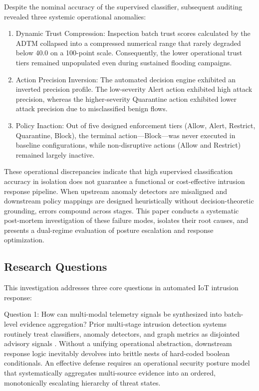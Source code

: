 \documentclass[journal,10pt,onecolumn]{IEEEtran}
\begin{document}
Despite the nominal accuracy of the supervised classifier, subsequent auditing revealed three systemic operational anomalies:
\begin{enumerate}
  \item Dynamic Trust Compression: Inspection batch trust scores calculated by the ADTM collapsed into a compressed numerical range that rarely degraded below 40.0 on a 100-point scale. Consequently, the lower operational trust tiers remained unpopulated even during sustained flooding campaigns.
  \item Action Precision Inversion: The automated decision engine exhibited an inverted precision profile. The low-severity Alert action exhibited high attack precision, whereas the higher-severity Quarantine action exhibited lower attack precision due to misclassified benign flows.
  \item Policy Inaction: Out of five designed enforcement tiers (Allow, Alert, Restrict, Quarantine, Block), the terminal action—Block—was never executed in baseline configurations, while non-disruptive actions (Allow and Restrict) remained largely inactive.
\end{enumerate}

These operational discrepancies indicate that high supervised classification accuracy in isolation does not guarantee a functional or cost-effective intrusion response pipeline. When upstream anomaly detectors are misaligned and downstream policy mappings are designed heuristically without decision-theoretic grounding, errors compound across stages. This paper conducts a systematic post-mortem investigation of these failure modes, isolates their root causes, and presents a dual-regime evaluation of posture escalation and response optimization.


\subsection{Research Questions}
This investigation addresses three core questions in automated IoT intrusion response:

Question 1: How can multi-modal telemetry signals be synthesized into batch-level evidence aggregation?
Prior multi-stage intrusion detection systems routinely treat classifiers, anomaly detectors, and graph metrics as disjointed advisory signals \cite{3, 17}. Without a unifying operational abstraction, downstream response logic inevitably devolves into brittle nests of hard-coded boolean conditionals. An effective defense requires an operational security posture model that systematically aggregates multi-source evidence into an ordered, monotonically escalating hierarchy of threat states.
\end{document}
